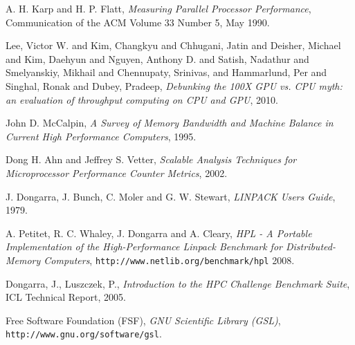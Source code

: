 \documentclass[a4paper]{report}
\begin{document}
\begin{thebibliography}{9}
  A. H. Karp and H. P. Flatt,
  \emph{Measuring Parallel Processor Performance},
  Communication of the ACM Volume 33 Number 5, May 1990.
  
  {Lee, Victor W. and Kim, Changkyu and Chhugani, Jatin and Deisher, Michael
    and Kim, Daehyun and Nguyen, Anthony D. and Satish, Nadathur and
    Smelyanskiy, Mikhail and Chennupaty}, Srinivas, and Hammarlund, Per and
  Singhal, Ronak and Dubey, Pradeep,
  \emph{Debunking the 100X GPU vs. CPU myth: an evaluation of throughput
    computing on CPU and GPU},
  2010.
  
  John D. McCalpin,
  \emph{A Survey of Memory Bandwidth and Machine Balance in Current High
    Performance Computers},
  1995.
  
  Dong H. Ahn and Jeffrey S. Vetter,
  \emph{Scalable Analysis Techniques for Microprocessor Performance Counter
    Metrics},
  2002.
  
  J. Dongarra, J. Bunch, C. Moler and G. W. Stewart, 
  \emph{LINPACK Users Guide},
  1979.
  
  A. Petitet, R. C. Whaley, J. Dongarra and A. Cleary, 
  \emph{HPL - A Portable Implementation of the High-Performance Linpack
    Benchmark for Distributed-Memory Computers}, {\tt http://www.netlib.org/benchmark/hpl}
  2008.

  Dongarra, J., Luszczek, P.,
  \emph{Introduction to the HPC Challenge Benchmark Suite}, ICL Technical Report,
  2005.  
  
  Free Software Foundation (FSF), \emph{GNU Scientific Library (GSL)},
  {\tt http://www.gnu.org/software/gsl}.

\end{thebibliography}
\end{document}
